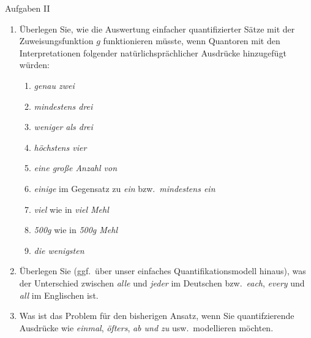 \begin{frame}
  {Aufgaben II}
  \begin{enumerate}
    \item Überlegen Sie, wie die Auswertung einfacher quantifizierter Sätze mit der Zuweisungsfunktion $g$ funktionieren müsste, wenn Quantoren mit den Interpretationen folgender natürlichsprächlicher Ausdrücke hinzugefügt würden:
      \begin{enumerate}
        \item \textit{genau zwei}
        \item \textit{mindestens drei}
        \item \textit{weniger als drei}
        \item \textit{höchstens vier}
        \item \textit{eine große Anzahl von}
        \item \textit{einige} im Gegensatz zu \textit{ein} bzw.\ \textit{mindestens ein}
        \item \textit{viel} wie in \textit{viel Mehl}
        \item \textit{500g} wie in \textit{500g Mehl}
        \item \textit{die wenigsten}
      \end{enumerate}
      \Halbzeile
    \item Überlegen Sie (ggf.\ über unser einfaches Quantifikationsmodell hinaus), was der Unterschied zwischen \textit{alle} und \textit{jeder} im Deutschen bzw.\ \textit{each}, \textit{every} und \textit{all} im Englischen ist.
      \Halbzeile
    \item Was ist das Problem für den bisherigen Ansatz, wenn Sie quantifzierende Ausdrücke wie \textit{einmal}, \textit{öfters}, \textit{ab und zu} usw.\ modellieren möchten.
  \end{enumerate}
\end{frame}

